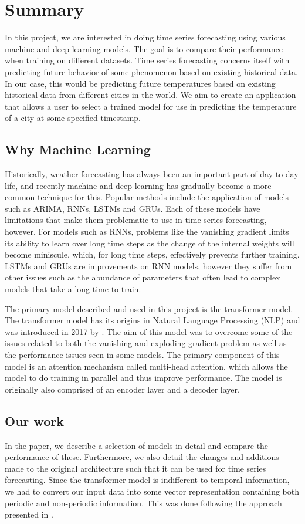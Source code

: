\section*{Summary}
In this project, we are interested in doing time series forecasting using various machine and deep learning models.
The goal is to compare their performance when training on different datasets.
Time series forecasting concerns itself with predicting future behavior of some phenomenon based on existing historical data.
In our case, this would be predicting future temperatures based on existing historical data from different cities in the world.
We aim to create an application that allows a user to select a trained model for use in predicting the temperature of a  city at some specified timestamp.

\subsection{Why Machine Learning}
Historically, weather forecasting has always been an important part of day-to-day life, and recently machine and deep learning has gradually become a more common technique for this.
Popular methods include the application of models such as ARIMA, RNNs, LSTMs and GRUs.
Each of these models have limitations that make them problematic to use in time series forecasting, however.
For models such as RNNs, problems like the vanishing gradient limits its ability to learn over long time steps as the change of the internal weights will become miniscule, which, for long time steps, effectively prevents further training.
LSTMs and GRUs are improvements on RNN models, however they suffer from other issues such as the abundance of parameters that often lead to complex models that take a long time to train.

The primary model described and used in this project is the transformer model.
The transformer model has its origins in Natural Language Processing (NLP) and was introduced in 2017 by \citet{AttentionIsAllYouNeed}. 
The aim of this model was to overcome some of the issues related to both the vanishing and exploding gradient problem as well as the performance issues seen in some models.
The primary component of this model is an attention mechanism called multi-head attention, which allows the model to do training in parallel and thus improve performance. 
The model is originally also comprised of an encoder layer and a decoder layer. 

\subsection{Our work}
In the paper, we describe a selection of models in detail and compare the performance of these.
Furthermore, we also detail the changes and additions made to the original architecture such that it can be used for time series forecasting.
Since the transformer model is indifferent to temporal information, we had to convert our input data into some vector representation containing both periodic and non-periodic information.
This was done following the approach presented in \citet{time2vec}.

